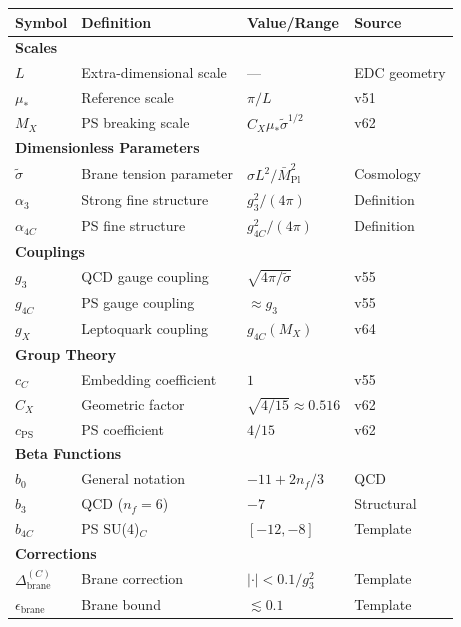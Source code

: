 \documentclass[11pt,a4paper]{article}
\theoremstyle{definition}
\begin{document}
\begin{notationbox}
\begin{center}
\begin{longtable}{llll}
\toprule
Symbol & Definition & Value/Range & Source \\
\midrule
\endhead
\multicolumn{4}{l}{\textbf{Scales}} \\
\midrule
$L$ & Extra-dimensional scale & --- & EDC geometry \\
$\mu_*$ & Reference scale & $\pi/L$ & v51 \\
$M_X$ & PS breaking scale & $C_X \mu_* \tilde{\sigma}^{1/2}$ & v62 \\
\midrule
\multicolumn{4}{l}{\textbf{Dimensionless Parameters}} \\
\midrule
$\tilde{\sigma}$ & Brane tension parameter & $\sigma L^2/\bar{M}_{\text{Pl}}^2$ & Cosmology \\
$\alpha_3$ & Strong fine structure & $g_3^2/(4\pi)$ & Definition \\
$\alpha_{4C}$ & PS fine structure & $g_{4C}^2/(4\pi)$ & Definition \\
\midrule
\multicolumn{4}{l}{\textbf{Couplings}} \\
\midrule
$g_3$ & QCD gauge coupling & $\sqrt{4\pi/\tilde{\sigma}}$ & v55 \\
$g_{4C}$ & PS gauge coupling & $\approx g_3$ & v55 \\
$g_X$ & Leptoquark coupling & $g_{4C}(M_X)$ & v64 \\
\midrule
\multicolumn{4}{l}{\textbf{Group Theory}} \\
\midrule
$c_C$ & Embedding coefficient & $1$ & v55 \\
$C_X$ & Geometric factor & $\sqrt{4/15} \approx 0.516$ & v62 \\
$c_{\text{PS}}$ & PS coefficient & $4/15$ & v62 \\
\midrule
\multicolumn{4}{l}{\textbf{Beta Functions}} \\
\midrule
$b_0$ & General notation & $-11 + 2n_f/3$ & QCD \\
$b_3$ & QCD ($n_f = 6$) & $-7$ & Structural \\
$b_{4C}$ & PS SU(4)$_C$ & $[-12, -8]$ & Template \\
\midrule
\multicolumn{4}{l}{\textbf{Corrections}} \\
\midrule
$\Delta_{\text{brane}}^{(C)}$ & Brane correction & $|\cdot| < 0.1/g_3^2$ & Template \\
$\epsilon_{\text{brane}}$ & Brane bound & $\lesssim 0.1$ & Template \\

\end{longtable}
\end{center}
\end{notationbox}
\end{document}
